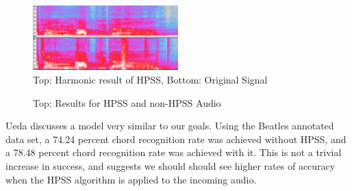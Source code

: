 \documentclass{article}
\begin{document}
\begin{figure}
   \centering
    \includegraphics[width=0.5\textwidth]{hpssspec.png}
   \caption{Top: Harmonic result of HPSS, Bottom: Original Signal}
   \label{fig:HPSS}
\end{figure}


\begin{figure}
\caption{Top: Results for HPSS and non-HPSS Audio}
\label{fig:resulttable}
\end{figure}

Ueda \cite{Ueda:19} discusses a model very similar to our goals. Using the Beatles 
annotated data set, a 74.24 percent chord recognition rate was achieved without HPSS, and 
a 78.48 percent chord recognition rate was achieved with it. This is not a trivial increase in
success, and suggests we should should see higher rates of accuracy when the
HPSS algorithm is applied to the incoming audio.
\end{document}
